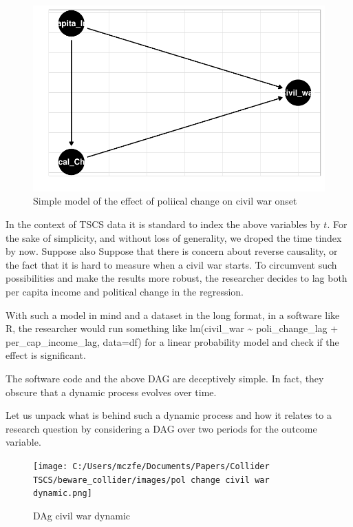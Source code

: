 \documentclass[
  super,
  preprint,
  3p]{elsarticle}
\begin{document}
\begin{figure}

{\centering \includegraphics{Papers_beware_collider_files/figure-pdf/fig-dag-model-basic-1.pdf}

}

\caption{\label{fig-dag-model-basic}Simple model of the effect of
poliical change on civil war onset}

\end{figure}

In the context of TSCS data it is standard to index the above variables
by \(t\). For the sake of simplicity, and without loss of generality, we
droped the time tindex by now. Suppose also Suppose that there is
concern about reverse causality, or the fact that it is hard to measure
when a civil war starts. To circumvent such possibilities and make the
results more robust, the researcher decides to lag both per capita
income and political change in the regression.

With such a model in mind and a dataset in the long format, in a
software like R, the researcher would run something like lm(civil\_war
\textasciitilde{} poli\_change\_lag + per\_cap\_income\_lag, data=df)
for a linear probability model and check if the effect is significant.

The software code and the above DAG are deceptively simple. In fact,
they obscure that a dynamic process evolves over time.

Let us unpack what is behind such a dynamic process and how it relates
to a research question by considering a DAG over two periods for the
outcome variable.

\begin{figure}

{\centering \texttt{[image: C:/Users/mczfe/Documents/Papers/Collider TSCS/beware\_collider/images/pol change civil war dynamic.png]}

}

\caption{DAg civil war dynamic}

\end{figure}
\end{document}
